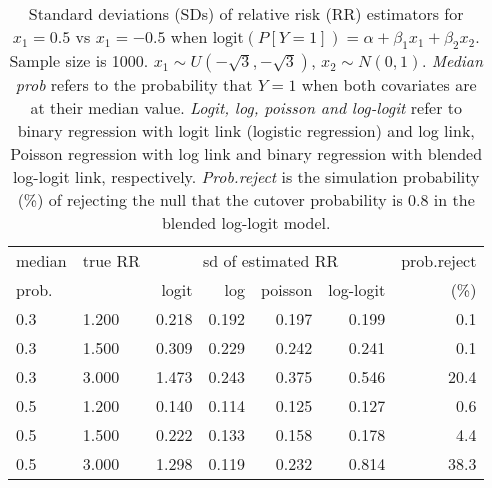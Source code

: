 \documentclass[12pt,a4paper]{article}
\begin{document}
\begin{table}[H] 
\small\sf\centering 
\caption{Standard deviations (SDs) of relative risk (RR) estimators for $x_1=0.5$ vs $x_1=-0.5$ when $\mbox{logit}(P[Y=1])=\alpha+\beta_1 x_1 + \beta_2 x_2$. Sample size is 1000. $x_1 \sim $$U(-\sqrt{3},-\sqrt{3})$, $x_2 \sim N(0,1)$. {\it Median prob} refers to the probability that $Y=1$ when both covariates are at their median value. {\it Logit, log, poisson and log-logit} refer to binary regression with logit link (logistic regression) and log link, Poisson regression with log link and binary regression with blended log-logit link, respectively. {\it Prob.reject} is the simulation probability (\%) of rejecting the null that the cutover probability is $0.8$ in the blended log-logit model.} 
\begin{tabular}{llrrrrr} 
\toprule 
median & true RR & \multicolumn{4}{c}{sd of estimated RR} & prob.reject \\ 
prob. & & logit & log & poisson & log-logit  & (\%) \\ \midrule 
0.3 & 1.200 & 0.218 & 0.192 & 0.197 & 0.199 &  0.1 \\  
0.3 & 1.500 & 0.309 & 0.229 & 0.242 & 0.241 &  0.1 \\  
0.3 & 3.000 & 1.473 & 0.243 & 0.375 & 0.546 & 20.4 \\  
0.5 & 1.200 & 0.140 & 0.114 & 0.125 & 0.127 &  0.6 \\  
0.5 & 1.500 & 0.222 & 0.133 & 0.158 & 0.178 &  4.4 \\  
0.5 & 3.000 & 1.298 & 0.119 & 0.232 & 0.814 & 38.3 \\  
\bottomrule 
\end{tabular} 
\end{table} 
\end{document}

